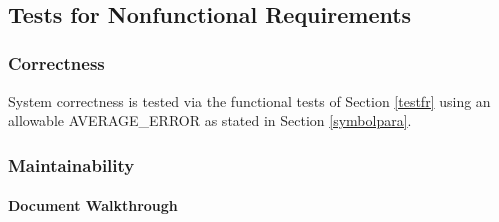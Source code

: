 \documentclass[12pt, titlepage]{article}
\begin{document}
~\newpage

\subsection{Tests for Nonfunctional Requirements}
\label{nfrtest}

\subsubsection{Correctness}

System correctness is tested via the functional tests of Section \ref{testfr}
using an allowable AVERAGE\_ERROR as stated in Section \ref{symbolpara}.

\subsubsection{Maintainability}
		
\paragraph{Document Walkthrough}
\end{document}
